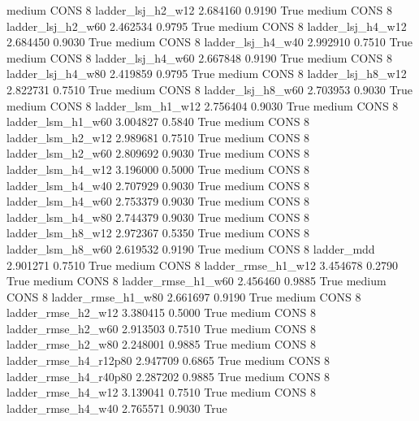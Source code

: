     medium     CONS                 8      ladder_lsj_h2_w12   2.684160      0.9190    True
    medium     CONS                 8      ladder_lsj_h2_w60   2.462534      0.9795    True
    medium     CONS                 8      ladder_lsj_h4_w12   2.684450      0.9030    True
    medium     CONS                 8      ladder_lsj_h4_w40   2.992910      0.7510    True
    medium     CONS                 8      ladder_lsj_h4_w60   2.667848      0.9190    True
    medium     CONS                 8      ladder_lsj_h4_w80   2.419859      0.9795    True
    medium     CONS                 8      ladder_lsj_h8_w12   2.822731      0.7510    True
    medium     CONS                 8      ladder_lsj_h8_w60   2.703953      0.9030    True
    medium     CONS                 8      ladder_lsm_h1_w12   2.756404      0.9030    True
    medium     CONS                 8      ladder_lsm_h1_w60   3.004827      0.5840    True
    medium     CONS                 8      ladder_lsm_h2_w12   2.989681      0.7510    True
    medium     CONS                 8      ladder_lsm_h2_w60   2.809692      0.9030    True
    medium     CONS                 8      ladder_lsm_h4_w12   3.196000      0.5000    True
    medium     CONS                 8      ladder_lsm_h4_w40   2.707929      0.9030    True
    medium     CONS                 8      ladder_lsm_h4_w60   2.753379      0.9030    True
    medium     CONS                 8      ladder_lsm_h4_w80   2.744379      0.9030    True
    medium     CONS                 8      ladder_lsm_h8_w12   2.972367      0.5350    True
    medium     CONS                 8      ladder_lsm_h8_w60   2.619532      0.9190    True
    medium     CONS                 8             ladder_mdd   2.901271      0.7510    True
    medium     CONS                 8     ladder_rmse_h1_w12   3.454678      0.2790    True
    medium     CONS                 8     ladder_rmse_h1_w60   2.456460      0.9885    True
    medium     CONS                 8     ladder_rmse_h1_w80   2.661697      0.9190    True
    medium     CONS                 8     ladder_rmse_h2_w12   3.380415      0.5000    True
    medium     CONS                 8     ladder_rmse_h2_w60   2.913503      0.7510    True
    medium     CONS                 8     ladder_rmse_h2_w80   2.248001      0.9885    True
    medium     CONS                 8  ladder_rmse_h4_r12p80   2.947709      0.6865    True
    medium     CONS                 8  ladder_rmse_h4_r40p80   2.287202      0.9885    True
    medium     CONS                 8     ladder_rmse_h4_w12   3.139041      0.7510    True
    medium     CONS                 8     ladder_rmse_h4_w40   2.765571      0.9030    True
